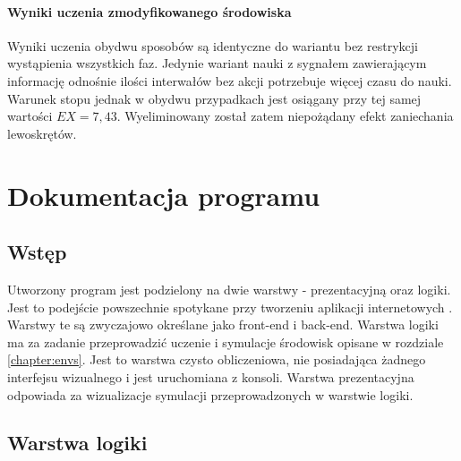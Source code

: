 \documentclass[12pt]{book}
\theoremstyle{plain}
\begin{document}
\subsubsection*{Wyniki uczenia zmodyfikowanego środowiska}
Wyniki uczenia obydwu sposobów są identyczne do wariantu bez restrykcji wystąpienia wszystkich faz. Jedynie wariant nauki z sygnałem zawierającym informację odnośnie ilości interwałów bez akcji potrzebuje więcej czasu do nauki. Warunek stopu jednak w obydwu przypadkach jest osiągany przy tej samej wartości $EX=7,43$. Wyeliminowany został zatem niepożądany efekt zaniechania lewoskrętów.




\chapter{Dokumentacja programu} \label{chapter:docs}
\section{Wstęp}
Utworzony program jest podzielony na dwie warstwy - prezentacyjną oraz logiki. Jest to podejście powszechnie spotykane przy tworzeniu aplikacji internetowych \cite{frontend_backend}. Warstwy te są zwyczajowo określane jako front-end i back-end. Warstwa logiki ma za zadanie przeprowadzić uczenie i symulacje środowisk opisane w rozdziale \ref{chapter:envs}. Jest to warstwa czysto obliczeniowa, nie posiadająca żadnego interfejsu wizualnego i jest uruchomiana z konsoli. Warstwa prezentacyjna odpowiada za wizualizacje symulacji przeprowadzonych w warstwie logiki.
\section{Warstwa logiki}
\end{document}
